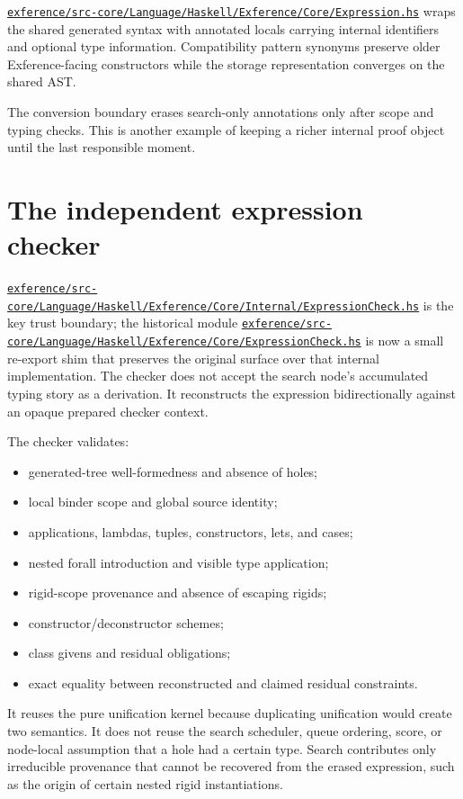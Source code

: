 \documentclass[10pt,letterpaper,oneside]{report}
\def\DjexBase{https://github.com/VladimirReshetnikov/Djex/blob/d3d9662598460316bdcd177ce6768c521e764aa8/}
\newcommand{\dpath}[1]{\href{\DjexBase#1}{\nolinkurl{#1}}}
\begin{document}
\dpath{exference/src-core/Language/Haskell/Exference/Core/Expression.hs} wraps the shared generated syntax with annotated locals carrying internal identifiers and optional type information. Compatibility pattern synonyms preserve older Exference-facing constructors while the storage representation converges on the shared AST.

The conversion boundary erases search-only annotations only after scope and typing checks. This is another example of keeping a richer internal proof object until the last responsible moment.

\section{The independent expression checker}\label{sec:exference-checker}

\dpath{exference/src-core/Language/Haskell/Exference/Core/Internal/ExpressionCheck.hs} is the key trust boundary; the historical module \dpath{exference/src-core/Language/Haskell/Exference/Core/ExpressionCheck.hs} is now a small re-export shim that preserves the original surface over that internal implementation. The checker does not accept the search node's accumulated typing story as a derivation. It reconstructs the expression bidirectionally against an opaque prepared checker context.

The checker validates:

\begin{itemize}
  \item generated-tree well-formedness and absence of holes;
  \item local binder scope and global source identity;
  \item applications, lambdas, tuples, constructors, lets, and cases;
  \item nested forall introduction and visible type application;
  \item rigid-scope provenance and absence of escaping rigids;
  \item constructor/deconstructor schemes;
  \item class givens and residual obligations;
  \item exact equality between reconstructed and claimed residual constraints.
\end{itemize}

It reuses the pure unification kernel because duplicating unification would create two semantics. It does not reuse the search scheduler, queue ordering, score, or node-local assumption that a hole had a certain type. Search contributes only irreducible provenance that cannot be recovered from the erased expression, such as the origin of certain nested rigid instantiations.
\end{document}
